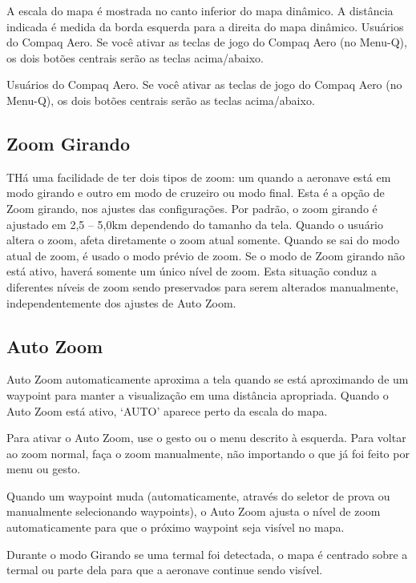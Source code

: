 A escala do mapa é mostrada no canto inferior do mapa dinâmico.  A distância indicada é medida da borda esquerda para a direita do mapa dinâmico.
Usuários do Compaq Aero.  Se você ativar as teclas de jogo do Compaq Aero (no Menu-Q), os dois botões centrais serão as teclas acima/abaixo.

Usuários do Compaq Aero.  Se você ativar as teclas de jogo do Compaq Aero (no Menu-Q), os dois botões centrais serão as teclas acima/abaixo.

\subsection*{Zoom Girando}
THá uma facilidade de ter dois tipos de zoom: um quando a aeronave está em modo girando e outro em modo de cruzeiro ou modo final.  Esta é a opção de Zoom girando, nos ajustes das configurações.  Por padrão, o zoom girando é ajustado em 2,5 – 5,0km dependendo do tamanho da tela.  Quando o usuário altera o zoom, afeta diretamente o zoom atual somente.  Quando se sai do modo atual de zoom, é usado o modo prévio de zoom. Se o modo de Zoom girando não está ativo, haverá somente um único nível de zoom.  Esta situação conduz a diferentes níveis de zoom sendo preservados para serem alterados manualmente, independentemente dos ajustes de Auto Zoom.
 
\subsection*{Auto Zoom}
Auto Zoom automaticamente aproxima a tela quando se está aproximando de um waypoint 
para manter a visualização em uma distância apropriada.  
Quando o Auto Zoom está ativo, ‘AUTO’ aparece perto da escala do mapa.

Para ativar o Auto Zoom, use o gesto  ou o menu descrito à esquerda.  
Para voltar ao zoom normal, faça o zoom manualmente, não importando o que já foi 
feito por menu ou gesto. 

Quando um waypoint muda (automaticamente, através do seletor de prova ou manualmente 
selecionando waypoints), o Auto Zoom ajusta o nível de zoom automaticamente para que 
o próximo waypoint seja visível no mapa.

Durante o modo Girando se uma termal foi detectada, o mapa é centrado sobre a termal 
ou parte dela para que a aeronave continue sendo visível.
 

